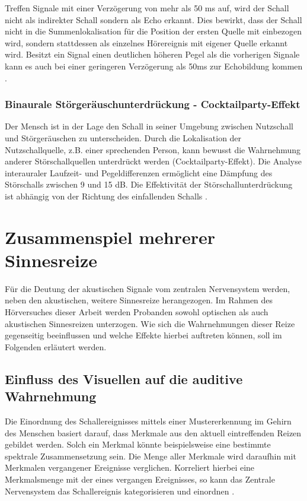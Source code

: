 Treffen Signale mit einer Verzögerung von mehr als 50 ms auf, wird der Schall nicht als indirekter Schall sondern als Echo erkannt. Dies bewirkt, dass der Schall nicht in die Summenlokalisation für die Position der ersten Quelle  mit einbezogen wird, sondern stattdessen als einzelnes Hörereignis mit eigener Quelle erkannt wird. Besitzt ein Signal einen deutlichen höheren Pegel als die vorherigen Signale kann es auch bei einer geringeren Verzögerung als 50ms zur Echobildung kommen \cite[S.49]{Genuit10}. 
 

\subsubsection{Binaurale Störgeräuschunterdrückung - Cocktailparty-Effekt}

Der Mensch ist in der Lage den Schall in seiner Umgebung zwischen Nutzschall und Störgeräuschen zu unterscheiden. Durch die Lokalisation der Nutzschallquelle, z.B. einer sprechenden Person, kann bewusst die Wahrnehmung anderer Störschallquellen unterdrückt werden (Cocktailparty-Effekt). Die Analyse interauraler Laufzeit- und Pegeldifferenzen ermöglicht eine Dämpfung des Störschalls zwischen 9 und 15 dB. Die Effektivität der Störschallunterdrückung ist abhängig von der Richtung des einfallenden Schalls \cite[S.48]{Genuit10}. 

\section{Zusammenspiel mehrerer Sinnesreize }
Für die Deutung der akustischen Signale vom zentralen Nervensystem werden, neben den akustischen, weitere Sinnesreize herangezogen. Im Rahmen des Hörversuches dieser Arbeit werden Probanden sowohl optischen als auch akustischen Sinnesreizen unterzogen. Wie sich die Wahrnehmungen dieser Reize gegenseitig beeinflussen und welche Effekte hierbei auftreten können, soll im Folgenden erläutert werden.

\subsection{Einfluss des Visuellen auf die auditive Wahrnehmung}
Die Einordnung des Schallereignisses mittels einer Mustererkennung im Gehirn des Menschen basiert darauf, dass Merkmale aus den aktuell eintreffenden Reizen gebildet werden. Solch ein Merkmal könnte beispielsweise eine bestimmte spektrale Zusammensetzung sein. Die Menge aller Merkmale wird daraufhin mit Merkmalen vergangener Ereignisse verglichen. Korreliert hierbei eine Merkmalsmenge mit der eines vergangen Ereignisses, so kann das Zentrale Nervensystem das Schallereignis kategorisieren und einordnen \cite[S.51]{HdA08}. \\ 

